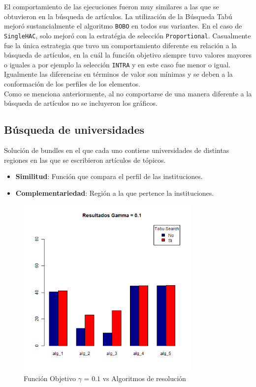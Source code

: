 El comportamiento de las ejecuciones fueron muy similares a las que se obtuvieron en la búsqueda de artículos. La utilización de la Búsqueda Tabú mejoró sustancialmente el algoritmo \texttt{BOBO} en todos sus variantes. En el caso de \texttt{SingleHAC}, solo mejoró con la estratégia de selección \texttt{Proportional}. Casualmente fue la única estrategia que tuvo un comportamiento diferente en relación a la búsqueda de artículos, en la cuál la función objetivo siempre tuvo valores mayores o iguales a por ejemplo la selección \texttt{INTRA} y en este caso fue menor o igual. Igualmente las diferencias en términos de valor son mínimas y se deben a la conformación de los perfiles de los elementos.\\
Como se menciona anteriormente, al no comportarse de una manera diferente a la búsqueda de artículos no se incluyeron los gráficos.
\newpage
\subsection{Búsqueda de universidades}\label{res:busInstituciones}
Solución de bundles en el que cada uno contiene universidades de distintas regiones en las que se escribieron artículos de tópicos.\\
\begin{itemize}
  \item \textbf{Similitud}: Función que compara el perfil de las instituciones.
  \item \textbf{Complementariedad}: Región a la que pertence la instituciones.
\end{itemize}

\begin{figure}[H]
  \centering
    \includegraphics[width=0.8\textwidth]{resultados/affiliations/Graficos_agrupados/gamma01-affiliations.png}
  \caption{Función Objetivo $\gamma$ = $0.1$ vs Algoritmos de resolución}
  \label{res:img-affiliations-agr-gamma01}
\end{figure}


